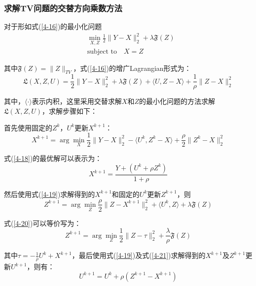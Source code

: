 \documentclass[12pt]{article}
\begin{document}
\subsubsection{求解TV问题的交替方向乘数方法}
对于形如式(\ref{4-16})的最小化问题
\begin{equation}\label{4-16}
\begin{aligned}
&\min_{X,Z}\frac{1}{2}\parallel Y-X \parallel_2^2+\lambda\mathfrak{F}(Z)\\
&\text{subject to} \quad X=Z
\end{aligned}
\end{equation}
\par
其中$\mathfrak{F}(Z)=\parallel Z \parallel_{TV}$，式(\ref{4-16})的增广Lagrangian形式为：
\begin{equation}\label{4-17}
\mathfrak{L}(X,Z,U)=\frac{1}{2}\parallel Y-X \parallel_2^2+\lambda \mathfrak{F}(Z)+\langle U,Z-X \rangle+\frac{1}{\rho}\parallel Z-X \parallel_2^2
\end{equation}
\par
其中，$\langle \cdot \rangle$表示内积，这里采用交替求解$X$和$Z$的最小化问题的方法求解$\mathfrak{L}(X,Z,U)$，求解步骤如下：
\par
首先使用固定的$Z^k$，$U^k$更新$X^{k+1}$：
\begin{equation}\label{4-18}
X^{k+1}=\arg\min_X \frac{1}{2}\parallel Y-X \parallel_2^2- \langle U^k,Z^k-X \rangle+\frac{\rho}{2}\parallel Z^k-X \parallel_2^2
\end{equation}
\par
式(\ref{4-18})的最优解可以表示为：
\begin{equation}\label{4-19}
X^{k+1}=\frac{Y+(U^k+\rho Z^k)}{1+\rho}
\end{equation}
\par
然后使用式(\ref{4-19})求解得到的$X^{k+1}$和固定的$U^k$更新$Z^{k+1}$，则
\begin{equation}\label{4-20}
Z^{k+1}=\arg\min_Z \frac{\rho}{2}\parallel Z-X^{k+1} \parallel_2^2+\langle U^k,Z \rangle+\lambda\mathfrak{F}(Z)
\end{equation}
\par
式(\ref{4-20})可以等价写为：
\begin{equation}\label{4-21}
Z^{k+1}=\arg\min_Z \frac{1}{2}\parallel Z-\tau \parallel_2^2+\frac{\lambda}{\rho}\mathfrak{F}(Z)
\end{equation}
\par
其中$\tau=-\frac{1}{\rho}U^k+X^{k+1}$，最后使用式(\ref{4-19})及式(\ref{4-21})求解得到的$X^{k+1}$及$Z^{k+1}$更新$U^{k+1}$，则有：
\begin{equation}\label{4-22}
U^{k+1}=U^k+\rho(Z^{k+1}-X^{k+1})
\end{equation}
\end{document}
